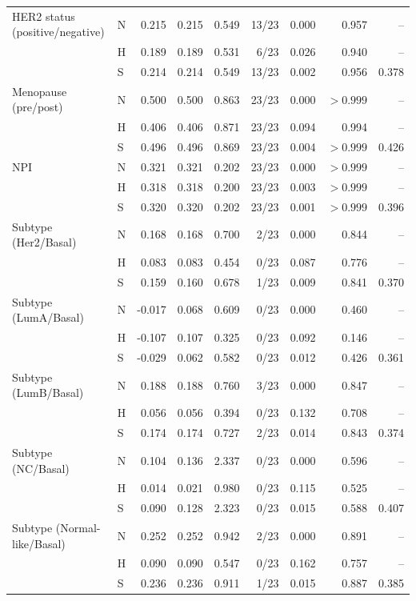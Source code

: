 \begin{longtable}{@{}>{\raggedright\arraybackslash}p{}lrrrrrrr@{}}
HER2 status (positive/negative) & N & 0.215 & 0.215 & 0.549 & 13/23 & 0.000 & 0.957 & --\\*
 & H & 0.189 & 0.189 & 0.531 & 6/23 & 0.026 & 0.940 & --\\*
 & S & 0.214 & 0.214 & 0.549 & 13/23 & 0.002 & 0.956 & 0.378\\[2pt]
Menopause (pre/post) & N & 0.500 & 0.500 & 0.863 & 23/23 & 0.000 & $>0.999$ & --\\*
 & H & 0.406 & 0.406 & 0.871 & 23/23 & 0.094 & 0.994 & --\\*
 & S & 0.496 & 0.496 & 0.869 & 23/23 & 0.004 & $>0.999$ & 0.426\\[2pt]
NPI & N & 0.321 & 0.321 & 0.202 & 23/23 & 0.000 & $>0.999$ & --\\*
 & H & 0.318 & 0.318 & 0.200 & 23/23 & 0.003 & $>0.999$ & --\\*
 & S & 0.320 & 0.320 & 0.202 & 23/23 & 0.001 & $>0.999$ & 0.396\\[2pt]
Subtype (Her2/Basal) & N & 0.168 & 0.168 & 0.700 & 2/23 & 0.000 & 0.844 & --\\*
 & H & 0.083 & 0.083 & 0.454 & 0/23 & 0.087 & 0.776 & --\\*
 & S & 0.159 & 0.160 & 0.678 & 1/23 & 0.009 & 0.841 & 0.370\\[2pt]
Subtype (LumA/Basal) & N & -0.017 & 0.068 & 0.609 & 0/23 & 0.000 & 0.460 & --\\*
 & H & -0.107 & 0.107 & 0.325 & 0/23 & 0.092 & 0.146 & --\\*
 & S & -0.029 & 0.062 & 0.582 & 0/23 & 0.012 & 0.426 & 0.361\\[2pt]
Subtype (LumB/Basal) & N & 0.188 & 0.188 & 0.760 & 3/23 & 0.000 & 0.847 & --\\*
 & H & 0.056 & 0.056 & 0.394 & 0/23 & 0.132 & 0.708 & --\\*
 & S & 0.174 & 0.174 & 0.727 & 2/23 & 0.014 & 0.843 & 0.374\\[2pt]
Subtype (NC/Basal) & N & 0.104 & 0.136 & 2.337 & 0/23 & 0.000 & 0.596 & --\\*
 & H & 0.014 & 0.021 & 0.980 & 0/23 & 0.115 & 0.525 & --\\*
 & S & 0.090 & 0.128 & 2.323 & 0/23 & 0.015 & 0.588 & 0.407\\[2pt]
Subtype (Normal-like/Basal) & N & 0.252 & 0.252 & 0.942 & 2/23 & 0.000 & 0.891 & --\\*
 & H & 0.090 & 0.090 & 0.547 & 0/23 & 0.162 & 0.757 & --\\*
 & S & 0.236 & 0.236 & 0.911 & 1/23 & 0.015 & 0.887 & 0.385\\[2pt]

\end{longtable}
